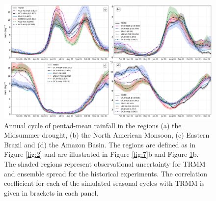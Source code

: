 \begin{figure}[b!]
\centering
 \includegraphics[width=1.0\linewidth]{figures/amipseasonalcycle.png}
\caption[Annual cycle of precipitation in different regions of the AMS]{Annual cycle of pentad-mean rainfall in the regions (a) the Midsummer drought, (b) the North American Monsoon, (c) Eastern Brazil and (d) the Amazon Basin. The regions are defined as in Figure \ref{fig:2} and are illustrated in Figure \ref{fig:7}b and Figure \ref{fig:8}b. The shaded regions represent observational uncertainty for TRMM and ensemble spread for the historical experiments. The correlation coefficient for each of the simulated seasonal cycles with TRMM is given in brackets in each panel.  }
\label{fig:8}
\end{figure}



